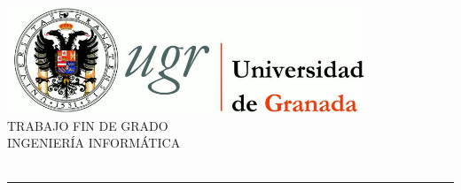 
\thispagestyle{empty}

\begin{titlepage}
 
 
\newlength{\centeroffset}
\setlength{\centeroffset}{-0.5\oddsidemargin}
\addtolength{\centeroffset}{0.5\evensidemargin}
\thispagestyle{empty}

\noindent\hspace*{\centeroffset}\begin{minipage}{\textwidth}

\centering
\includegraphics[width=0.8\textwidth]{01.Estructura/02.Portada/00.Figuras/01.logo_ugr.jpg}\\[1.4cm]

\textsc{ \Large TRABAJO FIN DE GRADO\\[0.2cm]}
\textsc{ INGENIERÍA INFORMÁTICA}\\[1cm]
% 
{\Large\bfseries \tfgtitlename\\
}
\noindent\rule[-1ex]{\textwidth}{3pt}\\[3.5ex]
{\large\bfseries \tfgsubtitlename}
\end{minipage}

\vspace{0.5cm}
\noindent\hspace*{\centeroffset}\begin{minipage}{\textwidth}
\centering




\end{minipage}
\end{titlepage}

